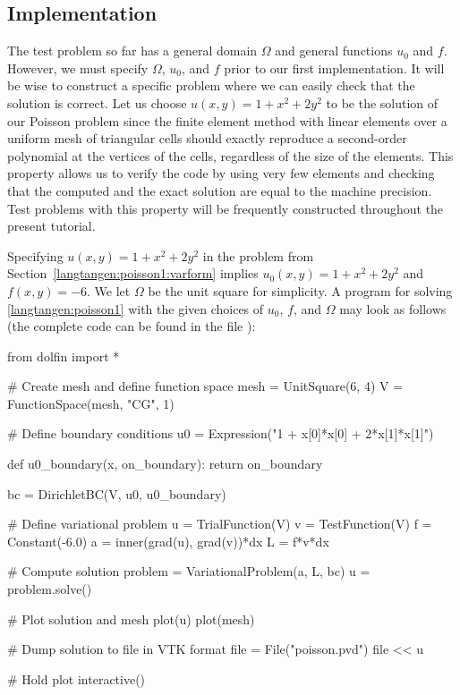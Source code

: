 \subsection{Implementation}
\label{langtangen:poisson1:impl}

The test problem so far has a general domain $\Omega$ and general functions
$u_0$ and $f$. However,
we must specify $\Omega$, $u_0$, and $f$ prior to our first implementation.
It will be wise to construct a specific problem where we can easily check
that the solution is correct.
Let us choose $u(x,y)=1 + x^2 + 2y^2$ to be the solution of our
Poisson problem since the finite element method with linear elements
over a uniform mesh of triangular cells
should exactly reproduce a second-order polynomial
at the vertices of the cells, regardless of the size
of the elements. This property allows us to verify the code by
using very few elements and
checking that the computed and the exact solution are equal to the
machine precision.
Test problems with this property will be frequently constructed throughout
the present
tutorial.

Specifying $u(x,y)=1 + x^2 + 2y^2$ in the
problem from Section~\ref{langtangen:poisson1:varform} implies
$u_0(x,y)= 1 + x^2 + 2y^2$
and $f(x,y)=-6$.
We let $\Omega$ be the unit square for simplicity.
A \fenics{} program for solving \eqref{langtangen:poisson1} with the given choices
of $u_0$, $f$, and $\Omega$ may look as follows (the complete code can be
found in the file ):

\begin{python}
from dolfin import *

# Create mesh and define function space
mesh = UnitSquare(6, 4)
V = FunctionSpace(mesh, "CG", 1)

# Define boundary conditions
u0 = Expression("1 + x[0]*x[0] + 2*x[1]*x[1]")

def u0_boundary(x, on_boundary):
    return on_boundary

bc = DirichletBC(V, u0, u0_boundary)

# Define variational problem
u = TrialFunction(V)
v = TestFunction(V)
f = Constant(-6.0)
a = inner(grad(u), grad(v))*dx
L = f*v*dx

# Compute solution
problem = VariationalProblem(a, L, bc)
u = problem.solve()

# Plot solution and mesh
plot(u)
plot(mesh)

# Dump solution to file in VTK format
file = File("poisson.pvd")
file << u

# Hold plot
interactive()
\end{python}

